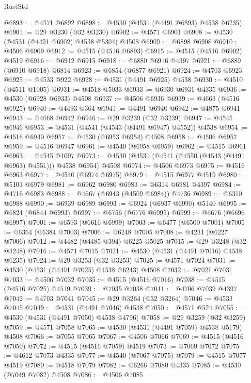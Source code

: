 \begin{lexlean}{RustStd}
\begin{coremodule}
{\begin{coremodule}
{{{{{{{{{{{{{{{{{{{{{{{{{{{{{{{{{{{{{{{{{{{{{{{{{{{{{{{@6893 := @4571 @6892
@6898 := @4530 (@4531 (@4491 @6893) @4538 @6235)
@6901 := @29 @3230 (@32 @3230)
@6902 := @4571 @6901
@6908 := @4530 (@4531 (@4491 @6902) @4538 @5304) @4508
@6909 := @6898 @6908
@6910 := @4506 @6909
@6912 := @4515 (@4516 @6893)
@6915 := @4515 (@4516 @6902) @4519
@6916 := @6912 @6915
@6918 := @6880 @6916 @4397
@6921 := @6889 (@6910 @6918) @6814
@6923 := @6854 (@6877 @6921)
@6924 := @4703 @6923
@6925 := @4533 @922
@6928 := @4531 (@4491 @6925) @4538
@6930 := @4510 (@4511 @1005)
@6931 := @4518 @5033
@6933 := @6930 @6931 @4335
@6936 := @4530 (@6928 @6933) @4508
@6937 := @4506 @6936
@6939 := @4663 (@4516 @6925)
@6940 := @4493 @364
@6941 := @4491 @6940
@6942 := @4875 @6941
@6943 := @4668 @6942
@6946 := @29 @3239 (@32 @3239)
@6947 := @4545 @6946
@6953 := @4531 (@4541 (@4543 (@4491 @6947) @4552)) @4538
@6954 := @4516 @6940
@6957 := @4530 (@6953 @6954) @4508
@6958 := @4506 @6957
@6959 := @4516 @6947
@6961 := @4540 (@6958 @6959)
@6962 := @4515 @6961
@6963 := @4545 @1097
@6973 := @4530 (@4531 (@4541 (@4550 (@4543 (@4491 @6963) @4551))) @4538 @6954) @4508
@6974 := @4506 @6973
@6975 := @4516 @6963
@6977 := @4540 (@6974 @6975)
@6979 := @4515 @6977 @4519
@6980 := @5103 @6979
@6981 := @6962 @6980
@6983 := @6314 @6981 @4397
@6984 := @4716 @6983
@6988 := @4667 (@6943 (@4509 @6984)) @4736
@6989 := @6310 @6988
@6990 := @6939 @6989
@6993 := @6924 (@6937 @6990) @5140
@6995 := @6824 (@6844 @6993)
@6997 := @6756 (@6776 @6995)
@6999 := @6676 (@6696 @6997)
@7001 := @6593 (@6616 @6999)
@7003 := @6477 (@6500 @7001)
@7005 := @6364 (@6384 @7003)
@7006 := @6248 @7005
@7008 := @4231 (@6227 @7006)
@7012 := @4482 (@4485 @394) @6225 @5025
@7015 := @29 @3248 (@32 @3248)
@7016 := @4571 @7015
@7021 := @4530 (@4531 (@4491 @7016) @4538 @6235)
@7024 := @29 @3253 (@32 @3253)
@7025 := @4571 @7024
@7031 := @4530 (@4531 (@4491 @7025) @4538 @6243) @4508
@7032 := @7021 @7031
@7033 := @4506 @7032
@7035 := @4515 (@4516 @7016)
@7038 := @4515 (@4516 @7025) @4519
@7039 := @7035 @7038
@7041 := @4706 @7039 @4397
@7042 := @4703 @7041
@7045 := @29 @3264 (@32 @3264)
@7046 := @4533 @7045
@7049 := @4531 (@4491 @7046) @4538
@7050 := @4571 @524
@7055 := @4530 (@4531 (@4491 @7050) @4538 @4796)
@7058 := @29 @3259 (@32 @3259)
@7059 := @4571 @7058
@7065 := @4530 (@4531 (@4491 @7059) @4538 @5179) @4508
@7066 := @7055 @7065
@7067 := @4506 @7066
@7069 := @4515 (@4516 @7050)
@7072 := @4515 (@4516 @7059) @4519
@7073 := @7069 @7072
@7075 := @4612 @7073 @4335
@7077 := @4540 (@7067 @7075)
@7079 := @4515 @7077 @4519
@7080 := @4518 @7079
@7082 := @6266 @7080 @4335
@7085 := @4530 (@7049 @7082) @4508
@7086 := @4506 @7085
}}}}}}}}}}}}}}}}}}}}}}}}}}}}}}}}}}}}}}}}}}}}}}}}}}}}}}}
\end{coremodule}}
\end{coremodule}
\end{lexlean}
